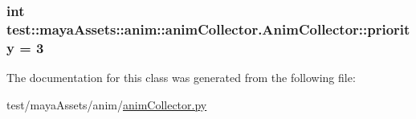 \hypertarget{classtest_1_1mayaAssets_1_1anim_1_1animCollector_1_1AnimCollector_a36e60cc06f56058a7b72bc3c1b81c90e}{
\subsubsection[{priority}]{\setlength{\rightskip}{0pt plus 5cm}int {\bf test\-::maya\-Assets\-::anim\-::anim\-Collector.\-Anim\-Collector\-::priority} = 3}}\label{d6/df4/classtest_1_1mayaAssets_1_1anim_1_1animCollector_1_1AnimCollector_a36e60cc06f56058a7b72bc3c1b81c90e}


\-The documentation for this class was generated from the following file\-:\begin{DoxyCompactItemize}
\item 
test/maya\-Assets/anim/\hyperlink{animCollector_8py}{anim\-Collector.\-py}\end{DoxyCompactItemize}
